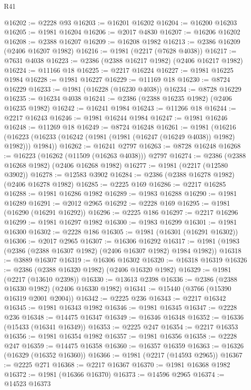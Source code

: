\begin{lexlean}{R41}
\begin{coremodule}
@16202 := @2228 @93
@16203 := @16201 @16202
@16204 := @16200 @16203
@16205 := @1981 @16204
@16206 := @2017 @4830
@16207 := @16206 @16202
@16208 := @2388 @16207
@16209 := @16208 @1982
@16213 := @2386 @16209 (@2406 @16207 @1982)
@16216 := @1981 (@2217 (@7628 @4038))
@16217 := @7631 @4038
@16223 := @2386 (@2388 @16217 @1982) (@2406 @16217 @1982)
@16224 := @11166 @18
@16225 := @2217 @16224
@16227 := @1981 @16225 @1984
@16228 := @1981 @16227
@16229 := @11169 @18
@16230 := @8724 @16229
@16233 := @1981 (@16228 (@16230 @4038))
@16234 := @8728 @16229
@16235 := @16234 @4038
@16241 := @2386 (@2388 @16235 @1982) (@2406 @16235 @1982)
@16242 := @16241 @1984
@16243 := @11266 @18
@16244 := @2217 @16243
@16246 := @1981 @16244 @1984
@16247 := @1981 @16246
@16248 := @11269 @18
@16249 := @8724 @16248
@16261 := @1981
    (@16216 (@16223 (@16233 (@16242 (@1981 (@1981 (@16247 (@16249 @4038)) @1982) @1982))) @1984))
@16262 := @16241 @2797
@16263 := @8728 @16248
@16268 := @16223 (@16262 (@11509 (@16263 @4038))) @2797
@16274 := @2386 (@2388 @16268 @1982) (@2406 @16268 @1982)
@16277 := @1981 (@2217 (@12580 @3902))
@16278 := @12583 @3902
@16284 := @2386 (@2388 @16278 @1982) (@2406 @16278 @1982)
@16285 := @2225 @169
@16286 := @2217 @16285
@16288 := @1981 @16286 @1982
@16289 := @1983 @16288
@16290 := @1981 @16289
@16291 := @2012 @2965
@16292 := @2228 @169
@16295 := @1981 (@16290 (@16291 @16292))
@16296 := @2225 @186
@16297 := @2217 @16296
@16299 := @1981 @16297 @1982
@16300 := @1983 @16299
@16301 := @1981 @16300
@16302 := @2228 @186
@16305 := @1981 (@16301 (@16291 @16302))
@16306 := @2017 @2965
@16307 := @16306 @16292
@16317 := @1981 (@1983 (@2386 (@2388 @16307 @1982) (@2406 @16307 @1982) @1984 @1982))
@16318 := @3889 @16307
@16319 := @16306 @16302
@16320 := @16318 @16319
@16326 := @2386 (@2388 @16320 @1982) (@2406 @16320 @1982)
@16329 := @1981 (@2217 (@13610 @2398))
@16330 := @13613 @2398
@16336 := @2386 (@2388 @16330 @1982) (@2406 @16330 @1982)
@16341 := @15440 (@3766 (@15390 @16319 @2001 @2004))
@16342 := @2225 @236
@16343 := @2217 @16342
@16345 := @1981 @16343 @1982
@16346 := @1981 @16345
@16347 := @2228 @236
@16348 := @14475 @16347
@16349 := @16346 @16348
@16352 := @16336 (@15433 (@16341 @16349))
@16353 := @2225 @247
@16354 := @2217 @16353
@16356 := @1981 @16354 @1982
@16357 := @1981 @16356
@16358 := @2228 @247
@16359 := @14475 @16358
@16360 := @16357 @16359
@16363 := @16326 (@16329 (@16352 @16360))
@16366 := @1981 (@2217 (@14593 @2965))
@16367 := @2225 @271
@16368 := @2217 @16367
@16370 := @1981 @16368 @1982
@16372 := @1981 (@16366 @16370)
@16373 := @14596 @2965
@16374 := @14523 @16373

\end{coremodule}
\end{lexlean}
